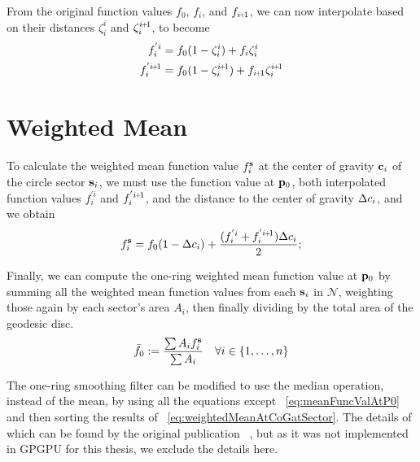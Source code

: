 From the original function values $f_0$, $f_i$, and $f_{\sipo}$, we can now interpolate based on their distances $\zeta^i_i$ and $\zeta^{\sipo}_i$, to become
\begin{align}
	f^{'i}_i & = f_0(1 - \zeta^i_i) + f_i\zeta^i_i \\
	f^{'\sipo}_i & = f_0(1 - \zeta^{\sipo}_i) + f_{\sipo}\zeta^{\sipo}_i
	\label{eq:interpolatedFs}
\end{align}
%
\section{Weighted Mean}
To calculate the weighted mean function value $f^{\mathbf{s}}_i$ at the center of gravity $\mathbf{c}_i$ of the circle sector $\mathbf{s}_i$, we must use the function value at $\mathbf{p}_0$, both interpolated function values $f^{'i}_i$ and $f^{'\sipo}_i$, and the distance to the center of gravity $\Delta c_i$, and we obtain
\begin{equation}
	f^\bs_i = f_0(1 - \Dc_i) + \frac{(f^{'i}_i + f^{'\sipo}_i)\Dc_i}{2};
	\label{eq:weightedMeanAtCoGatSector}
\end{equation}

Finally, we can compute the one-ring weighted mean function value at $\mathbf{p}_0$ by summing all the weighted mean function values from each $\mathbf{s}_i$ in $\mathcal{N}$, weighting those again by each sector's area $A_i$, then finally dividing by the total area of the geodesic disc.
\begin{equation}
	\bar{f}_0 := \frac{\sum A_if^{\mathbf{s}}_i}{\sum A_i} \quad \forall i \in \{1,\ldots,n\}
	\label{eq:meanFuncValAtP0}
\end{equation}%
%

The one-ring smoothing filter can be modified to use the median operation, instead of the mean, by using all the equations except ~\ref{eq:meanFuncValAtP0} and then sorting the results of ~\ref{eq:weightedMeanAtCoGatSector}. The details of which can be found by the original publication ~\cite[s.~3.2]{Mara17}, but as it was not implemented in GPGPU for this thesis, we exclude the details here. 
%
